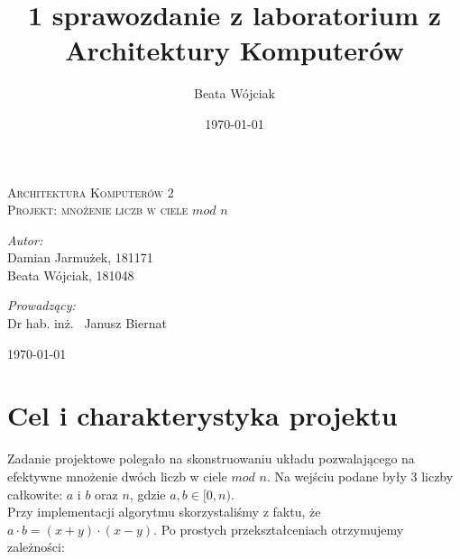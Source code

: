 \documentclass[a4paper]{article}
\author{Beata Wójciak}
\title{1 sprawozdanie z laboratorium z Architektury Komputerów}
\date{\today}
\begin{document}
\begin{titlepage}
\vspace*{\fill}
 \begin{center}

  \textsc{\LARGE Architektura Komputerów 2}\\[2.0cm]
  \textsc{\Large Projekt: mnożenie liczb w ciele $mod$ $n$}\\[1.5cm] 

\vspace*{\fill}
  \begin{minipage}{0.4\textwidth}
    \begin{flushleft} \large
    \emph{Autor:}\\
    Damian Jarmużek, 181171 \\ Beata Wójciak, 181048
    \end{flushleft}
    \end{minipage}
    \begin{minipage}{0.4\textwidth}
    \begin{flushright} \large
    \emph{Prowadzący:} \\
    Dr hab. inż. ~Janusz Biernat
    \end{flushright}
  \end{minipage}

\vspace*{\fill}
{\large \today}
 \end{center}

\end{titlepage}

\newpage
\tableofcontents
\newpage

\section{Cel i charakterystyka projektu}
Zadanie projektowe polegało na skonstruowaniu układu pozwalającego na efektywne mnożenie dwóch liczb w ciele $mod$ $n$. Na wejściu podane były 3
liczby całkowite: $a$ i $b$ oraz $n$, gdzie $a,b \in [0,n)$. \\ Przy implementacji algorytmu skorzystaliśmy z faktu, że $a{\cdot}b = (x+y){\cdot}(x-y)$. 
Po prostych przekształceniach otrzymujemy zależności: 
\end{document}
